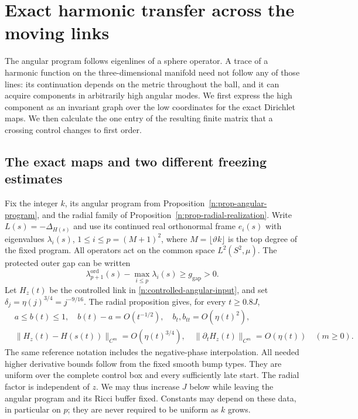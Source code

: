 \section{Exact harmonic transfer across the moving links}
\label{n:sec-transfer}

The angular program follows eigenlines of a sphere operator.  A trace of a
harmonic function on the three-dimensional manifold need not follow any of
those lines: its continuation depends on the metric throughout the ball, and
it can acquire components in arbitrarily high angular modes.  We first
express the high component as an invariant graph over the low coordinates
for the exact Dirichlet maps.  We then calculate the one entry of the
resulting finite matrix that a crossing control changes to first order.

\subsection{The exact maps and two different freezing estimates}

Fix the integer $k$, its angular program from
Proposition~\ref{n:prop-angular-program}, and the radial family of
Proposition~\ref{n:prop-radial-realization}. Write
$L(s)=-\Delta_{H(s)}$ and use its continued real orthonormal frame
$e_i(s)$ with eigenvalues $\lambda_i(s)$, $1\le i\le p=(M+1)^2$,
where $M=\lfloor\vartheta k\rfloor$ is the top degree of the fixed program.
All operators act on the common space $L^2(S^2,\mu)$.
The protected outer gap can be written
\begin{equation}
 \lambda_{p+1}^{\mathrm{ord}}(s)-\max_{i\le p}\lambda_i(s)
 \ge g_{\mathrm{gap}}>0.
 \label{n:eq-outer-angular-gap}
\end{equation}
Let $H_z(t)$ be the controlled link in
\eqref{n:controlled-angular-input}, and set
$\delta_j=\eta(j)^{3/4}=j^{-9/16}$.
The radial proposition gives, for every $t\ge0.8J$,
\begin{align}
 &a\le b(t)\le1,\quad b(t)-a=O(t^{-1/2}),\quad
   b_t,b_{tt}=O(\eta(t)^2), \label{n:eq-transfer-radial-input}\\
 &\|H_z(t)-H(s(t))\|_{C^m}=O(\eta(t)^{3/4}),\quad
   \|\partial_tH_z(t)\|_{C^m}=O(\eta(t))
   \quad(m\ge0). \label{n:eq-transfer-slow-input}
\end{align}
The same reference notation includes the negative-phase interpolation.
All needed higher derivative bounds follow from the fixed smooth bump
types. They are uniform over the complete control box and every
sufficiently late start. The radial factor is independent of $z$.
We may thus increase $J$ below while leaving the angular program and its
Ricci buffer fixed. Constants may depend on these data, in particular on
$p$; they are never required to be uniform as $k$ grows.

